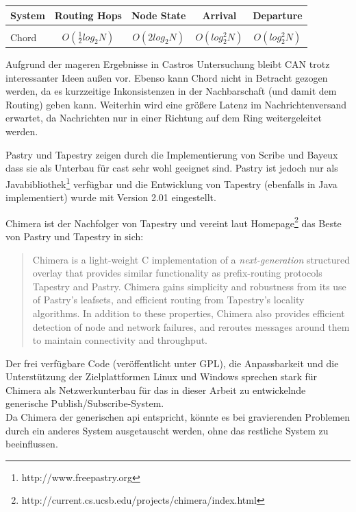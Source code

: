 \begin{tabular}{l|c|c|c|c} \\
System & Routing Hops & Node State & Arrival & Departure\\ \hline \\
Chord & $O(\frac{1}{2}log_2 N)$ & $O(2log_2 N) $ & $ O(log_2^2 N) $ & $ O(log_2^2 N) $
\label{tab:evaluation_p2p}
\end{tabular}

Aufgrund der mageren Ergebnisse in Castros Untersuchung \cite{Castro2003Evaluation} bleibt CAN trotz interessanter Ideen außen vor. Ebenso kann Chord nicht in Betracht gezogen werden, da es kurzzeitige Inkonsistenzen in der Nachbarschaft (und damit dem Routing) geben kann. Weiterhin wird eine größere Latenz im Nachrichtenversand erwartet, da Nachrichten nur in einer Richtung auf dem Ring weitergeleitet werden.

Pastry und Tapestry zeigen durch die Implementierung von Scribe und Bayeux \cite{Castro2002Scribe, Zhuang2001} dass sie als Unterbau für \ac{cast} sehr wohl geeignet sind. Pastry ist jedoch nur als Javabibliothek\footnote{http://www.freepastry.org} verfügbar und die Entwicklung von Tapestry (ebenfalls in Java implementiert) wurde mit Version 2.01 eingestellt.

Chimera ist der Nachfolger von Tapestry und vereint laut Homepage\footnote{http://current.cs.ucsb.edu/projects/chimera/index.html} das Beste von Pastry und Tapestry in sich: 

\begin{quote}
Chimera is a light-weight C implementation of a \emph{next-generation} structured overlay that provides similar functionality as prefix-routing protocols Tapestry and Pastry.  Chimera gains simplicity and robustness from its use of Pastry's leafsets, and efficient routing from Tapestry's locality algorithms.  In addition to these properties, Chimera also provides efficient detection of node and network failures, and reroutes messages around them to maintain connectivity and throughput.  
\end{quote}

Der frei verfügbare Code (veröffentlicht unter GPL), die Anpassbarkeit und die Unterstützung der Zielplattformen Linux und Windows sprechen stark für Chimera als Netzwerkunterbau für das in dieser Arbeit zu entwickelnde generische Publish/Subscribe-System.\\
Da Chimera der generischen \ac{api} entspricht, könnte es bei gravierenden Problemen durch ein anderes System ausgetauscht werden, ohne das restliche System zu beeinflussen.
